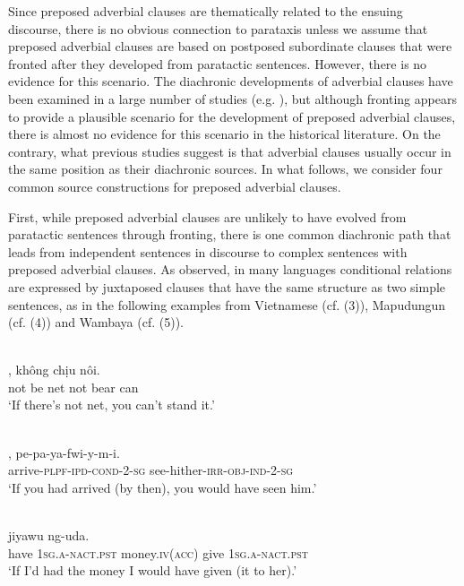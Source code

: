 \documentclass[output=paper]{langsci/langscibook}
\begin{document}
Since preposed adverbial clauses are thematically related to the ensuing discourse, there is no obvious connection to parataxis unless we assume that preposed adverbial clauses are based on postposed subordinate clauses that were fronted after they developed from paratactic sentences. However, there is no evidence for this scenario. The diachronic developments of adverbial clauses have been examined in a large number of studies (e.g. \citealt{Haiman1985,Haspelmath1989,Givón1991,Genetti1991,HarrisCampbell1995,Frajzyngier1996,DisterheftViti2010}), but although fronting appears to provide a plausible scenario for the development of preposed adverbial clauses, there is almost no evidence for this scenario in the historical literature. On the contrary, what previous studies suggest is that adverbial clauses usually occur in the same position as their diachronic sources. In what follows, we consider four common source constructions for preposed adverbial clauses.

First, while preposed adverbial clauses are unlikely to have evolved from paratactic sentences through fronting, there is one common diachronic path that leads from independent sentences in discourse to complex sentences with preposed adverbial clauses. As \citet[39--70]{Haiman1985} observed, in many languages conditional relations are expressed by juxtaposed clauses that have the same structure as two simple sentences, as in the following examples from Vietnamese (cf. (3)), Mapudungun (cf. (4)) and Wambaya (cf. (5)).

\ea\label{ex:key:}
\\
,  không  chịu  nôi.\\
       not  be   net  not  bear  can\\
\glt   `If there’s not net, you can’t stand it.'
\z

\ea\label{ex:key:}
\\
,    pe-pa-ya-fwi-y-m-i.\\
       arrive-\textsc{plpf}-\textsc{ipd}-\textsc{cond}-2-\textsc{sg}  see-hither-\textsc{irr}-\textsc{obj}-\textsc{ind}-2-\textsc{sg}\\
\glt   `If you had arrived (by then), you would have seen him.'
\z

\ea\label{ex:key:}
\\
            jiyawu  ng-uda.\\
       have    \textsc{1sg}.\textsc{a-nact.pst}  money.\textsc{iv(acc)}  give  1\textsc{sg.a-nact.pst}\\
\glt   `If I’d had the money I would have given (it to her).'
\z
\end{document}
